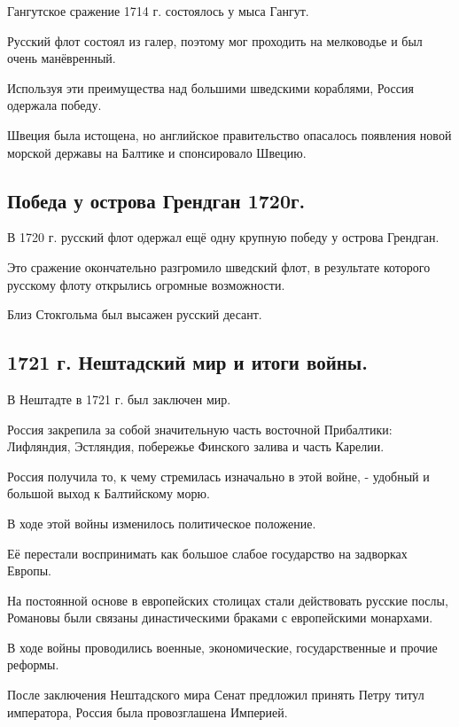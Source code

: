 Гангутское сражение 1714 г. состоялось у мыса Гангут. 

Русский флот состоял из галер, поэтому мог проходить на мелководье и был очень манёвренный. 

Используя эти преимущества над большими шведскими кораблями, Россия одержала победу.

Швеция была истощена, но английское правительство опасалось появления новой морской державы на Балтике и спонсировало Швецию.

\subsection{Победа у острова Грендган 1720г.}

В 1720 г. русский флот одержал ещё одну крупную победу у острова Грендган. 

Это сражение окончательно разгромило шведский флот, в результате которого русскому флоту открылись огромные возможности. 

Близ Стокгольма был высажен русский десант.

\subsection{1721 г. Нештадский мир и итоги войны.}

В Нештадте в 1721 г. был заключен мир. 

Россия закрепила за собой значительную часть восточной Прибалтики: Лифляндия, Эстляндия, побережье Финского залива и часть Карелии. 

Россия получила то, к чему стремилась изначально в этой войне, - удобный и большой выход к Балтийскому морю.

В ходе этой войны изменилось политическое положение. 

Её перестали воспринимать как большое слабое государство на задворках Европы. 

На постоянной основе в европейских столицах стали действовать русские послы, Романовы были связаны династическими браками с европейскими монархами. 

В ходе войны проводились военные, экономические, государственные и прочие реформы. 

После заключения Нештадского мира Сенат предложил принять Петру титул императора, Россия была провозглашена Империей.
